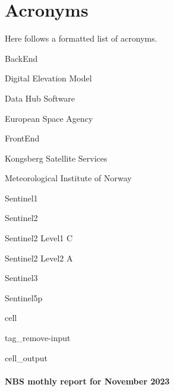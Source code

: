 \documentclass[letterpaper,10pt,english]{jupyterBook}
\begin{document}
\sphinxstepscope


\chapter{Acronyms}
\label{\detokenize{acronyms:acronyms}}\label{\detokenize{acronyms::doc}}
\sphinxAtStartPar
Here follows a formatted list of acronyms.

\sphinxAtStartPar
{}
BackEnd

\sphinxAtStartPar
{}
Digital Elevation Model

\sphinxAtStartPar
{}
Data Hub Software

\sphinxAtStartPar
{}
European Space Agency

\sphinxAtStartPar
{}
FrontEnd

\sphinxAtStartPar
{}
Kongsberg Satellite Services

\sphinxAtStartPar
{}
Meteorological Institute of Norway

\sphinxAtStartPar
{}
Sentinel\sphinxhyphen{}1

\sphinxAtStartPar
{}
Sentinel\sphinxhyphen{}2

\sphinxAtStartPar
{}
Sentinel\sphinxhyphen{}2 Level\sphinxhyphen{}1 C

\sphinxAtStartPar
{}
Sentinel\sphinxhyphen{}2 Level\sphinxhyphen{}2 A

\sphinxAtStartPar
{}
Sentinel\sphinxhyphen{}3

\sphinxAtStartPar
{}
Sentinel\sphinxhyphen{}5p

\sphinxstepscope

\begin{sphinxuseclass}{cell}
\begin{sphinxuseclass}{tag_remove-input}\begin{sphinxVerbatimOutput}

\begin{sphinxuseclass}{cell_output}\subsubsection*{NBS mothly report for November 2023}

\end{sphinxuseclass}\end{sphinxVerbatimOutput}

\end{sphinxuseclass}
\end{sphinxuseclass}
\end{document}
